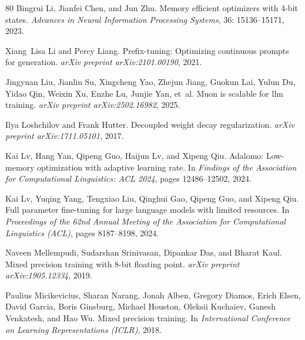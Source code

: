 \documentclass[10pt,twocolumn,letterpaper]{article}
\theoremstyle{plain}
\theoremstyle{definition}
\theoremstyle{remark}
\begin{document}
{\begin{thebibliography}{80}
Bingrui Li, Jianfei Chen, and Jun Zhu.
\newblock Memory efficient optimizers with 4-bit states.
\newblock \emph{Advances in Neural Information Processing Systems},
  36: 15136--15171, 2023.

Xiang~Lisa Li and Percy Liang.
\newblock Prefix-tuning: Optimizing continuous prompts for generation.
\newblock \emph{arXiv preprint arXiv:2101.00190}, 2021.

Jingyuan Liu, Jianlin Su, Xingcheng Yao, Zhejun Jiang, Guokun Lai, Yulun Du,
  Yidao Qin, Weixin Xu, Enzhe Lu, Junjie Yan, et~al.
\newblock Muon is scalable for llm training.
\newblock \emph{arXiv preprint arXiv:2502.16982}, 2025.

Ilya Loshchilov and Frank Hutter.
\newblock Decoupled weight decay regularization.
\newblock \emph{arXiv preprint arXiv:1711.05101}, 2017.

Kai Lv, Hang Yan, Qipeng Guo, Haijun Lv, and Xipeng Qiu.
\newblock Adalomo: Low-memory optimization with adaptive learning rate.
\newblock In \emph{Findings of the Association for Computational Linguistics:
  ACL 2024}, pages 12486--12502, 2024{}.

Kai Lv, Yuqing Yang, Tengxiao Liu, Qinghui Gao, Qipeng Guo, and Xipeng Qiu.
\newblock Full parameter fine-tuning for large language models with limited
  resources.
\newblock In \emph{Proceedings of the 62nd Annual Meeting of the Association
  for Computational Linguistics (ACL)}, pages 8187--8198, 2024{}.

Naveen Mellempudi, Sudarshan Srinivasan, Dipankar Das, and Bharat Kaul.
\newblock Mixed precision training with 8-bit floating point.
\newblock \emph{arXiv preprint arXiv:1905.12334}, 2019.

Paulius Micikevicius, Sharan Narang, Jonah Alben, Gregory Diamos, Erich Elsen,
  David Garcia, Boris Ginsburg, Michael Houston, Oleksii Kuchaiev, Ganesh
  Venkatesh, and Hao Wu.
\newblock Mixed precision training.
\newblock In \emph{International Conference on Learning Representations
  (ICLR)}, 2018.


\end{thebibliography}}
\end{document}
